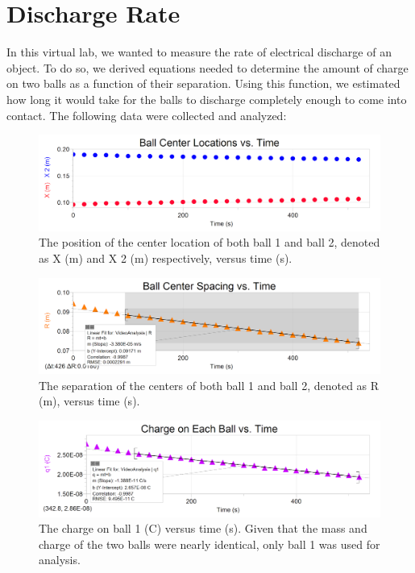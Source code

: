 \documentclass[oneside,12pt]{amsart}
\begin{document}
	\section{Discharge Rate}
	In this virtual lab, we wanted to measure the rate of electrical discharge of an object. To do so, we derived equations needed to determine the amount of charge on two balls as a function of their separation. Using this function, we estimated how long it would take for the balls to discharge completely enough to come into contact. The following data were collected and analyzed: 
		\begin{figure}[h]
		\includegraphics[width=\linewidth,scale=0.01]{LocvTime.png}
		\caption{The position of the center location of both ball 1 and ball 2, denoted as X (m) and X 2 (m) respectively, versus time (s).}
		\label{loc}
	\end{figure}
\begin{figure}[h]
	\includegraphics[width=\linewidth,scale=0.01]{SpacevTime.png}
	\caption{The separation of the centers of both ball 1 and ball 2, denoted as R (m), versus time (s).}
	\label{Space}
\end{figure}

\begin{figure}[h]
	\includegraphics[width=\linewidth,scale=0.01]{ChargevTime.png}
	\caption{The charge on ball 1 (C) versus time (s). Given that the mass and charge of the two balls were nearly identical, only ball 1 was used for analysis.}
	\label{Charge}
\end{figure}
	
\end{document}
